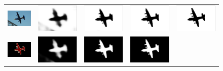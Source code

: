 \begin{figure}[ht]
  \centering
  \begin{tabular}{c c c c c}
    \includegraphics[width=0.15\linewidth]{fig/mean_field_illustration/2007_007470.jpg} & 
    \includegraphics[width=0.15\linewidth]{fig/mean_field_illustration/Belief_Class0_Itr0.pdf} & 
    \includegraphics[width=0.15\linewidth]{fig/mean_field_illustration/Belief_Class0_Itr1.pdf} & 
    \includegraphics[width=0.15\linewidth]{fig/mean_field_illustration/Belief_Class0_Itr2.pdf} & 
    \includegraphics[width=0.15\linewidth]{fig/mean_field_illustration/Belief_Class0_Itr10.pdf} \\
    \includegraphics[width=0.15\linewidth]{fig/mean_field_illustration/2007_007470.png} & 
    \includegraphics[width=0.15\linewidth]{fig/mean_field_illustration/Belief_Class1_Itr0.pdf} & 
    \includegraphics[width=0.15\linewidth]{fig/mean_field_illustration/Belief_Class1_Itr1.pdf} & 
    \includegraphics[width=0.15\linewidth]{fig/mean_field_illustration/Belief_Class1_Itr2.pdf} & 

\end{tabular}
\end{figure}
